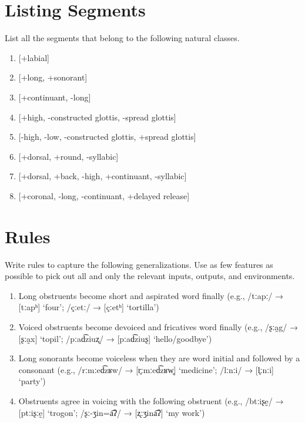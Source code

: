 \documentclass[12pt, letterpaper]{article}
\begin{document}
\section{Listing Segments} 

List all the segments that belong to the following natural classes.

\begin{enumerate}
	\item {}[+labial]
	\item {}[+long, +sonorant]
	\item {}[+continuant, -long]
	\item {}[+high, -constructed glottis, -spread glottis]
	\item {}[-high, -low, -constructed glottis, +spread glottis]
	\item {}[+dorsal, +round, -syllabic]
	\item {}[+dorsal, +back, -high, +continuant, -syllabic]
	\item {}[+coronal, -long, -continuant, +delayed release]
\end{enumerate}

\section{Rules} 

Write rules to capture the following generalizations. Use as few features as possible to pick out all and only the relevant inputs, outputs, and environments.

\begin{enumerate}
	\item Long obstruents become short and aspirated word finally (e.g., /tːapː/ → [tːapʰ] `four'; /çːetː/ → [çːetʰ] `tortilla') 
	\vspace{0.75cm}
	\item Voiced obstruents become devoiced and fricatives word finally (e.g., /ʂːa̰g/ → [ʂːa̰x] `topil'; /pːad͡ziuʐ/ → [pːad͡ziuʂ] `hello/goodbye')
	\vspace{0.75cm}
	\item Long sonorants become voiceless when they are word initial and followed by a consonant (e.g., /rːmːed͡zʁw/ → [r̥ːmːed͡zʁw̥] `medicine'; /lːnːi/ → [l̥ːnːi] `party')
	\vspace{0.75cm}
	\item Obstruents agree in voicing with the following obstruent (e.g., /btːiʂḛ/ → [ptːiʂːḛ] `trogon'; /ʂː-ʒin=a͡ʔ/ → [ʐːʒina͡ʔ] `my work')
\end{enumerate}
\end{document}
